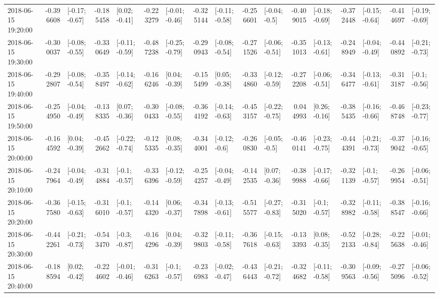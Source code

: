 \begin{tabular}{lrlrlrlrlrlrlrlrl}
2018-06-15 19:20:00 & -0.396608 &  [-0.17; -0.67] & -0.185458 &   [0.02; -0.41] & -0.223279 &  [-0.01; -0.46] & -0.325144 &  [-0.11; -0.58] & -0.256601 &   [-0.04; -0.5] & -0.409015 &  [-0.18; -0.69] & -0.372448 &  [-0.15; -0.64] & -0.414697 &  [-0.19; -0.69] \\
2018-06-15 19:30:00 & -0.300037 &  [-0.08; -0.55] & -0.330649 &  [-0.11; -0.59] & -0.487238 &  [-0.25; -0.79] & -0.290943 &  [-0.08; -0.54] & -0.271526 &  [-0.06; -0.51] & -0.351013 &  [-0.13; -0.61] & -0.248949 &  [-0.04; -0.49] & -0.440892 &  [-0.21; -0.73] \\
2018-06-15 19:40:00 & -0.292807 &  [-0.08; -0.54] & -0.358497 &  [-0.14; -0.62] & -0.166246 &   [0.04; -0.39] & -0.155499 &   [0.05; -0.38] & -0.334860 &  [-0.12; -0.59] & -0.272208 &  [-0.06; -0.51] & -0.346477 &  [-0.13; -0.61] & -0.313187 &   [-0.1; -0.56] \\
2018-06-15 19:50:00 & -0.254950 &  [-0.04; -0.49] & -0.138335 &   [0.07; -0.36] & -0.300433 &  [-0.08; -0.55] & -0.364192 &  [-0.14; -0.63] & -0.453157 &  [-0.22; -0.75] &  0.044993 &   [0.26; -0.16] & -0.385435 &  [-0.16; -0.66] & -0.468748 &  [-0.23; -0.77] \\
2018-06-15 20:00:00 & -0.164592 &   [0.04; -0.39] & -0.452662 &  [-0.22; -0.74] & -0.125335 &   [0.08; -0.35] & -0.344001 &   [-0.12; -0.6] & -0.260830 &   [-0.05; -0.5] & -0.460141 &  [-0.23; -0.75] & -0.444391 &  [-0.21; -0.73] & -0.379042 &  [-0.16; -0.65] \\
2018-06-15 20:10:00 & -0.247964 &  [-0.04; -0.49] & -0.314884 &   [-0.1; -0.57] & -0.336396 &  [-0.12; -0.59] & -0.254257 &  [-0.04; -0.49] & -0.142535 &   [0.07; -0.36] & -0.389988 &  [-0.17; -0.66] & -0.321139 &   [-0.1; -0.57] & -0.269954 &  [-0.06; -0.51] \\
2018-06-15 20:20:00 & -0.367580 &  [-0.15; -0.63] & -0.316010 &   [-0.1; -0.57] & -0.144320 &   [0.06; -0.37] & -0.347898 &  [-0.13; -0.61] & -0.515577 &  [-0.27; -0.83] & -0.315020 &   [-0.1; -0.57] & -0.328982 &  [-0.11; -0.58] & -0.388547 &  [-0.16; -0.66] \\
2018-06-15 20:30:00 & -0.442261 &  [-0.21; -0.73] & -0.543470 &   [-0.3; -0.87] & -0.164296 &   [0.04; -0.39] & -0.329803 &  [-0.11; -0.58] & -0.367618 &  [-0.15; -0.63] & -0.133393 &   [0.08; -0.35] & -0.522133 &  [-0.28; -0.84] & -0.225638 &  [-0.01; -0.46] \\
2018-06-15 20:40:00 & -0.188594 &   [0.02; -0.42] & -0.224602 &  [-0.01; -0.46] & -0.316263 &   [-0.1; -0.57] & -0.236983 &  [-0.02; -0.47] & -0.436443 &  [-0.21; -0.72] & -0.324682 &  [-0.11; -0.58] & -0.309563 &  [-0.09; -0.56] & -0.275096 &  [-0.06; -0.52] \\

\end{tabular}
